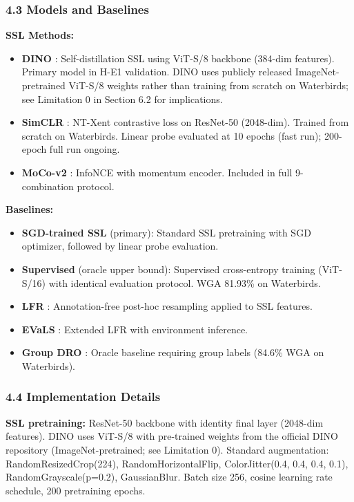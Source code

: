 \subsubsection{4.3 Models and Baselines}

\textbf{SSL Methods:}
\begin{itemize}
\item \textbf{DINO} \citep{caron2021dino}: Self-distillation SSL using ViT-S/8 backbone (384-dim features). Primary model in H-E1 validation. DINO uses publicly released ImageNet-pretrained ViT-S/8 weights rather than training from scratch on Waterbirds; see Limitation 0 in Section 6.2 for implications.
\item \textbf{SimCLR} \citep{chen2020simclr}: NT-Xent contrastive loss on ResNet-50 (2048-dim). Trained from scratch on Waterbirds. Linear probe evaluated at 10 epochs (fast run); 200-epoch full run ongoing.
\item \textbf{MoCo-v2} \citep{chen2020simclr}: InfoNCE with momentum encoder. Included in full 9-combination protocol.
\end{itemize}

\textbf{Baselines:}
\begin{itemize}
\item \textbf{SGD-trained SSL} (primary): Standard SSL pretraining with SGD optimizer, followed by linear probe evaluation.
\item \textbf{Supervised} (oracle upper bound): Supervised cross-entropy training (ViT-S/16) with identical evaluation protocol. WGA 81.93\% on Waterbirds.
\item \textbf{LFR} \citep{ghaznavi2023lfr}: Annotation-free post-hoc resampling applied to SSL features.
\item \textbf{EVaLS} \citep{ghaznavi2024evals}: Extended LFR with environment inference.
\item \textbf{Group DRO} \citep{Sagawa2019}: Oracle baseline requiring group labels (84.6\% WGA on Waterbirds).
\end{itemize}

\subsubsection{4.4 Implementation Details}

\textbf{SSL pretraining:} ResNet-50 backbone with identity final layer (2048-dim features). DINO uses ViT-S/8 with pre-trained weights from the official DINO repository (ImageNet-pretrained; see Limitation 0). Standard augmentation: RandomResizedCrop(224), RandomHorizontalFlip, ColorJitter(0.4, 0.4, 0.4, 0.1), RandomGrayscale(p=0.2), GaussianBlur. Batch size 256, cosine learning rate schedule, 200 pretraining epochs.

